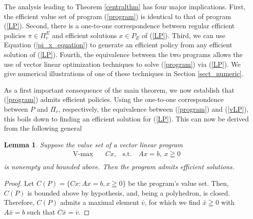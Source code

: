\documentclass{article}
\newtheorem{lemma}[theorem]{Lemma}
\theoremstyle{definition}
\numberwithin{equation}{section}
\begin{document}
{The analysis leading to Theorem \ref{centralthm} has four major implications. 
First, the efficient value set of program (\ref{program}) is identical to that of program (\ref{LP}). Second, there is a one-to-one correspondence between regular efficient policies $\pi \in \Pi^E_r$
and efficient solutions $x\in P_E$ of (\ref{LP}). 
Third, we can use Equation (\ref{pi_x_equation}) to generate an efficient policy from any efficient solution of (\ref{LP}). 
Fourth, the equivalence between the two programs allows the use of vector linear optimization techniques to solve (\ref{program}) via (\ref{LP}). We give numerical illustrations of one of these techniques in Section \ref{sect_numeric}. 






As a first important consequence of the main theorem, we now
establish that (\ref{program}) admits efficient policies. 
Using the one-to-one correspondence between $P$ and $\Pi_r$, respectively, the
equivalence between (\ref{program}) and (\ref{vLP}), this boils down to finding an efficient solution 
for (\ref{LP}). This can now be derived from the following
general

\begin{lemma}
\label{existence}
    Suppose the value set of a vector linear program \begin{equation*}
\begin{aligned}
\operatorname{V-max} \quad & Cx, & \textrm{s.t.} \quad Ax = b,\ x \geqq 0\\
\end{aligned}
\end{equation*}is nonempty and bounded above. Then the program admits efficient solutions.
\end{lemma}

\begin{proof}
    Let $C(P) = \{Cx: Ax=b, x\geqq 0\}$ be the program's value set. Then, $C(P)$ is bounded above
    by hypothesis, and, being 
    a polyhedron, is closed. Therefore, $C(P)$ admits a maximal element
    $\bar{v}$, for which we find $\bar{x}\geqq 0$ with $A\bar{x}=b$ such that $C\bar{x}=\bar{v}$.
\end{proof}

}
\end{document}
